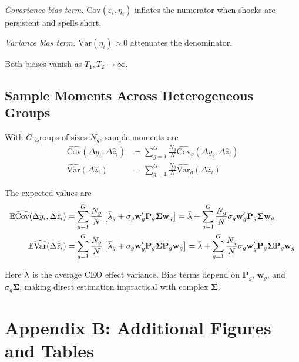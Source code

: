 \documentclass[11pt,a4paper]{article}
\newcommand{\Var}{\text{Var}}
\newcommand{\Cov}{\text{Cov}}
\begin{document}
\textit{Covariance bias term.} $\Cov(\varepsilon_i,\eta_i)$ inflates the numerator when shocks are persistent and spells short.

\textit{Variance bias term.} $\Var(\eta_i)>0$ attenuates the denominator.

Both biases vanish as $T_1,T_2\to\infty$. 

\subsection{Sample Moments Across Heterogeneous Groups}

With $G$ groups of sizes $N_g$, sample moments are
\begin{align}
\widehat{\Cov}(\Delta y_i,\Delta \hat z_i) &= \sum_{g=1}^G \frac{N_g}{N} \widehat{\Cov}_g(\Delta y_i,\Delta \hat z_i)\\
\widehat{\Var}(\Delta \hat z_i) &= \sum_{g=1}^G \frac{N_g}{N} \widehat{\Var}_g(\Delta \hat z_i)
\end{align}

The expected values are
\begin{align}
\mathbb E\widehat{\Cov}(\Delta y_i,\Delta \hat z_i) &= \sum_{g=1}^G \frac{N_g}{N} \left[ 
\Bar\lambda_g
+ \sigma_g \mathbf w_g' \mathbf P_g\mathbf\Sigma \mathbf w_g\right] = 
\Bar\lambda +\sum_{g=1}^G \frac{N_g}{N} \sigma_g \mathbf w_g' \mathbf P_g\mathbf\Sigma \mathbf w_g\\
\mathbb E\widehat{\Var}(\Delta \hat z_i) &= \sum_{g=1}^G \frac{N_g}{N} \left[ 
\Bar\lambda_g
+ \sigma_g \mathbf w_g' \mathbf P_g\mathbf\Sigma \mathbf P_g \mathbf w_g\right] = 
\Bar\lambda +\sum_{g=1}^G \frac{N_g}{N} \sigma_g \mathbf w_g' \mathbf P_g\mathbf\Sigma \mathbf P_g \mathbf w_g
\end{align}

Here $\Bar\lambda$ is the average CEO effect variance. Bias terms depend on $\mathbf P_g$, $\mathbf w_g$, and $\sigma_g\mathbf\Sigma$, making direct estimation impractical with complex $\mathbf\Sigma$.

\clearpage

\section*{Appendix B: Additional Figures and Tables}

\renewcommand{\thefigure}{B\arabic{figure}} 
\renewcommand{\thetable}{B\arabic{table}}
\setcounter{figure}{0}
\setcounter{table}{0}
\end{document}
